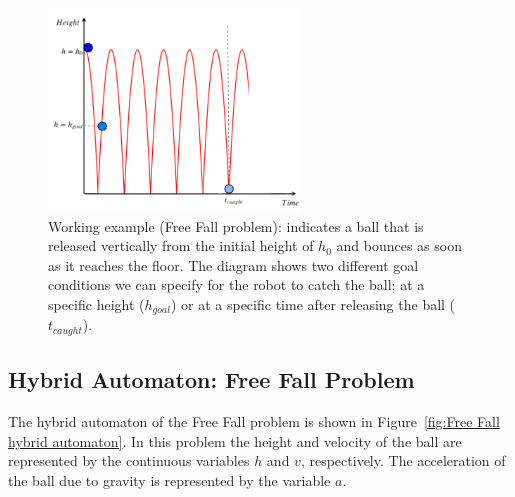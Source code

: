 \begin{figure}[!ht]
\centering
\includegraphics[width=0.60\textwidth]{diagrams/FreeFall2.png}
\caption{Working example (Free Fall problem): indicates a ball that is released vertically from the initial height of $h_0$ and bounces as soon as it reaches the floor. The diagram shows two different goal conditions we can specify for the robot to catch the ball; at a specific height ($h_{goal}$) or at a specific time after releasing the ball ($t_{caught}$).}
\label{fig:Freefall}
\end{figure}




\subsection{Hybrid Automaton: Free Fall Problem}

The hybrid automaton of the Free Fall problem is shown in Figure~\ref{fig:Free Fall hybrid automaton}. In this problem the height and velocity of the ball are represented by the continuous variables $h$ and $v$, respectively. The acceleration of the ball due to gravity is represented by the variable $a$.

